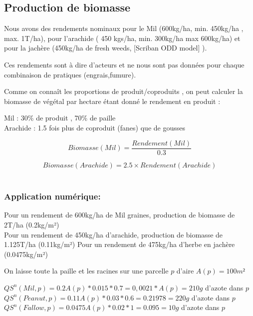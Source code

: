 \documentclass[10pt,a4paper,french]{article} %
\begin{document}
\subsection{Production de biomasse}


Nous avons des rendements nominaux pour le Mil (600kg/ha, min. 450kg/ha , max. 1T/ha), pour l'arachide ( 450 kgs/ha, min. 300kg/ha max 600kg/ha) et pour la jachère (450kg/ha de fresh weeds, [Scriban ODD model] ).

Ces rendements sont à dire d'acteurs et ne nous sont pas données pour chaque combinaison de pratiques (engrais,fumure).

Comme on connaît les proportions de  produit/coproduits , on peut calculer la biomasse de végétal par hectare étant donné le rendement en produit : 

Mil : 30\% de produit ,  70\% de paille \\
Arachide : 1.5 fois plus de coproduit (fanes) que de gousses

\begin{equation}
Biomasse(Mil) =  \frac{Rendement(Mil)}{0.3}
\end{equation}

\begin{equation}
Biomasse(Arachide) =  2.5 \times Rendement(Arachide)
\end{equation}\\


\subsubsection{Application numérique:} 

Pour un rendement de 600kg/ha de Mil graines, production de biomasse de 2T/ha (0.2kg/m²)\\
Pour un rendement de 450kg/ha d'arachide, production de biomasse de 1.125T/ha (0.11kg/m²)
Pour un rendement de 475kg/ha d'herbe en jachère (0.0475kg/m²) 



On laisse toute la paille et les racines sur une parcelle $p$ d'aire $A(p)=100m²$


$QS^{n}(Mil, p)= 0.2 A(p)* 0.015 * 0.7 = 0,0021* A(p)= 210g$ d'azote dans $p$ \\
$QS^{n}(Peanut, p)= 0.11 A(p) * 0.03 * 0.6 = 0.21978 = 220g$ d'azote dans $p$\\
$QS^{n}(Fallow, p)= 0.0475 A(p)* 0.02 * 1 = 0.095 = 10g$ d'azote dans $p$ \\
\end{document}
